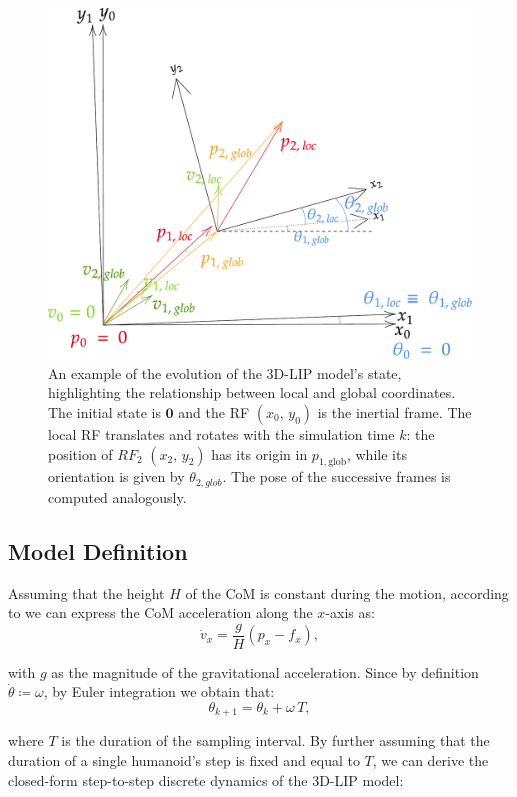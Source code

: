 \begin{figure}[h]
    \centering
    \includegraphics[width=0.75\linewidth]{figures/LIP/loc_to_glob_tfm2.pdf}
    \caption{An example of the evolution of the 3D-LIP model's state, highlighting the relationship between local and global coordinates. The initial state is $\mathbf{0}$ and the RF $(x_0,\, y_0)$ is the inertial frame. The local RF translates and rotates with the simulation time $k$: the position of $RF_2$ $(x_2,\, y_2)$ has its origin in $p_{1, \text{glob}}$, while its orientation is given by $\theta_{2, glob}$. The pose of the successive frames is computed analogously.}
    \label{fig:loc_to_glob_tfm}
\end{figure}

\subsection{Model Definition}
Assuming that the height $H$ of the CoM is constant during the motion, according to \cite{peng_main_paper} we can express the CoM acceleration along the $x$-axis as:
$$
\dot{v}_x = \frac{g}{H}\left(p_x - f_x\right),
$$

with $g$ as the magnitude of the gravitational acceleration. Since by definition $\dot{\theta} \coloneqq \omega$, by Euler integration we obtain that:
$$
\theta_{k+1} = \theta_k + \omega \, T,
$$

where $T$ is the duration of the sampling interval. By further assuming that the duration of a single humanoid's step is fixed and equal to $T$, we can derive the closed-form step-to-step discrete dynamics of the 3D-LIP model:

